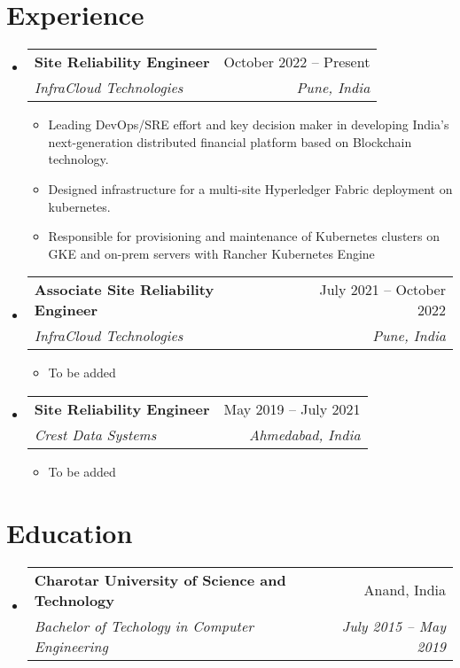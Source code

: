 \documentclass[letterpaper,11pt]{article}
\makeatletter
\newcommand{\resumeItem}[1]{
  \item\small{
    {#1 \vspace{-2pt}}
  }
}
\newcommand{\resumeSubheading}[4]{
  \vspace{-2pt}\item
    \begin{tabular*}{0.97\textwidth}[t]{l@{\extracolsep{\fill}}r}
      \textbf{#1} & #2 \\
      \textit{\small#3} & \textit{\small #4} \\
    \end{tabular*}\vspace{-7pt}
}
\newcommand{\resumeSubSubheading}[2]{
    \item
    \begin{tabular*}{0.97\textwidth}{l@{\extracolsep{\fill}}r}
      \textit{\small#1} & \textit{\small #2} \\
    \end{tabular*}\vspace{-7pt}
}
\newcommand{\resumeSubHeadingListStart}{\begin{itemize}[leftmargin=0.15in, label={}]}
\newcommand{\resumeSubHeadingListEnd}{\end{itemize}}
\newcommand{\resumeItemListStart}{\begin{itemize}}
\newcommand{\resumeItemListEnd}{\end{itemize}\vspace{-5pt}}
\makeatother
\begin{document}
\section{Experience}
  \resumeSubHeadingListStart

    \resumeSubheading
      {Site Reliability Engineer}{October 2022 -- Present}
      {InfraCloud Technologies}{Pune, India}
      \resumeItemListStart
        \resumeItem{Leading DevOps/SRE effort and key decision maker in developing India's next-generation distributed financial platform based on Blockchain technology.}
        \resumeItem{Designed infrastructure for a multi-site Hyperledger Fabric deployment on kubernetes.}
        \resumeItem{Responsible for provisioning and maintenance of Kubernetes clusters on GKE and on-prem servers with Rancher Kubernetes Engine}
      \resumeItemListEnd
      

    \resumeSubheading
      {Associate Site Reliability Engineer}{July 2021 -- October 2022}
      {InfraCloud Technologies}{Pune, India}
      \resumeItemListStart
        \resumeItem{To be added}
    \resumeItemListEnd

    \resumeSubheading
      {Site Reliability Engineer}{May 2019 -- July 2021}
      {Crest Data Systems}{Ahmedabad, India}
      \resumeItemListStart
        \resumeItem{To be added}
      \resumeItemListEnd

  \resumeSubHeadingListEnd


\section{Education}
  \resumeSubHeadingListStart
    \resumeSubheading
      {Charotar University of Science and Technology}{Anand, India}
      {Bachelor of Techology in Computer Engineering}{July 2015 -- May 2019}
  \resumeSubHeadingListEnd

\end{document}
